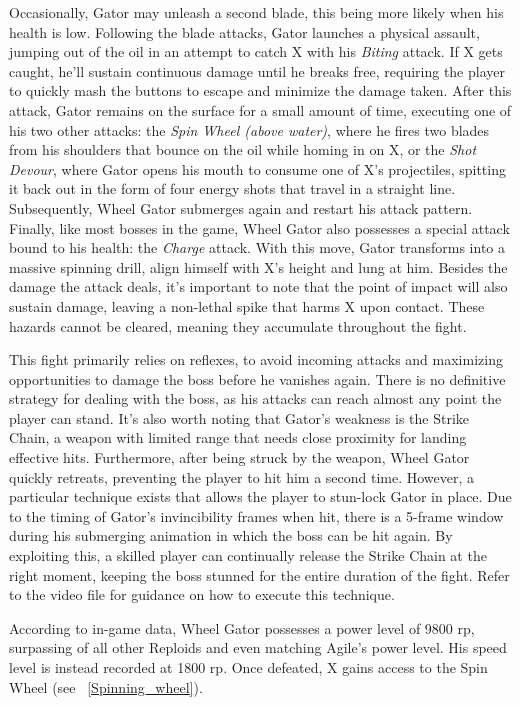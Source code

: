 Occasionally, Gator may unleash a second blade, this being more likely when his health is low. Following the blade attacks, Gator launches a physical assault, jumping out of the oil in an attempt to catch X with his \emph{Biting} attack. If X gets caught, he'll sustain continuous damage until he breaks free, requiring the player to quickly mash the buttons to escape and minimize the damage taken. After this attack, Gator remains on the surface for a small amount of time, executing one of his two other attacks: the \emph{Spin Wheel (above water)}, where he fires two blades from his shoulders that bounce on the oil while homing in on X, or the \emph{Shot Devour}, where Gator opens his mouth to consume one of X's projectiles, spitting it back out in the form of four energy shots that travel in a straight line. Subsequently, Wheel Gator submerges again and restart his attack pattern. Finally, like most bosses in the game, Wheel Gator also possesses a special attack bound to his health: the \emph{Charge} attack. With this move, Gator transforms into a massive spinning drill, align himself with X's height and lung at him. Besides the damage the attack deals, it's important to note that the point of impact will also sustain damage, leaving a non-lethal spike that harms X upon contact. These hazards cannot be cleared, meaning they accumulate throughout the fight.


This fight primarily relies on reflexes, to avoid incoming attacks and maximizing opportunities to damage the boss before he vanishes again. There is no definitive strategy for dealing with the boss, as his attacks can reach almost any point the player can stand. It's also worth noting that Gator's weakness is the Strike Chain, a weapon with limited range that needs close proximity for landing effective hits. Furthermore, after being struck by the weapon, Wheel Gator quickly retreats, preventing the player to hit him a second time. However, a particular technique exists that allows the player to stun-lock Gator in place. Due to the timing of Gator's invincibility frames when hit, there is a 5-frame window~\cite{rta:x2} during his submerging animation in which the boss can be hit again. By exploiting this, a skilled player can continually release the Strike Chain at the right moment, keeping the boss stunned for the entire duration of the fight. Refer to the video file  for guidance on how to execute this technique.

According to in-game data, Wheel Gator possesses a power level of 9800 rp, surpassing  of all other Reploids and even matching Agile's power level. His speed level is instead recorded at 1800 rp. Once defeated, X gains access to the Spin Wheel (see ~\ref{Spinning_wheel}). 

